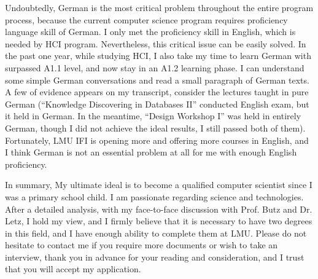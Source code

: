 \documentclass[11pt,a4paper,sans]{moderncv}        %
\begin{document}
Undoubtedly, German is the most critical problem throughout the entire program process, 
because the current computer science program requires proficiency language skill of German. 
I only met the proficiency skill in English, which is needed by HCI program. Nevertheless, 
this critical issue can be easily solved. In the past one year, while studying HCI, I also 
take my time to learn German with surpassed A1.1 level, and now stay in an A1.2 learning 
phase. I can understand some simple German conversations and read a small paragraph of 
German texts. A few of evidence appears on my transcript, consider the lectures taught in 
pure German (``Knowledge Discovering in Databases II'' conducted English exam, but it held 
in German. In the meantime, ``Design Workshop I'' was held in entirely German, though I 
did not achieve the ideal results, I still passed both of them). Fortunately, LMU IFI is 
opening more and offering more courses in English, and I think German is not an essential 
problem at all for me with enough English proficiency.

\vspace{5mm}

In summary, My ultimate ideal is to become a qualified computer scientist since I was a 
primary school child. I am passionate regarding science and technologies. After a detailed 
analysis, with my face-to-face discussion with Prof. Butz and Dr. Letz, I hold my view, 
and I firmly believe that it is necessary to have two degrees in this field, and I have 
enough ability to complete them at LMU. Please do not hesitate to contact me if you 
require more documents or wish to take an interview, thank you in advance for your reading 
and consideration, and I trust that you will accept my application.

\makeletterclosing
\end{document}
